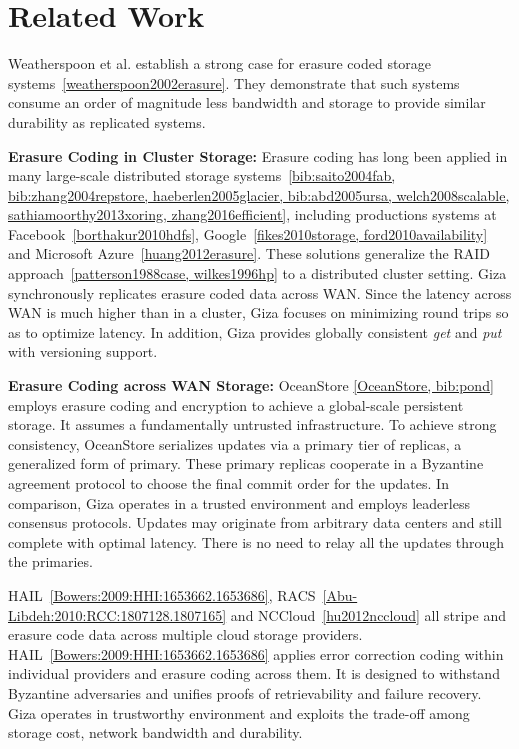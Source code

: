 \section{Related Work}


Weatherspoon et al. establish a strong case for erasure coded storage systems~\ref{weatherspoon2002erasure}. They demonstrate that such systems consume an order of magnitude less bandwidth and storage to provide similar durability as replicated systems.

{\bf Erasure Coding in Cluster Storage:}
Erasure coding has long been applied in many large-scale distributed storage systems~\ref{bib:saito2004fab, bib:zhang2004repstore, haeberlen2005glacier, bib:abd2005ursa, welch2008scalable, sathiamoorthy2013xoring, zhang2016efficient}, including productions systems at Facebook~\ref{borthakur2010hdfs}, Google~\ref{fikes2010storage, ford2010availability} and Microsoft Azure~\ref{huang2012erasure}. These solutions generalize the RAID approach~\ref{patterson1988case, wilkes1996hp} to a distributed cluster setting. Giza synchronously replicates erasure coded data across WAN. Since the latency across WAN is much higher than in a cluster, Giza focuses on minimizing round trips so as to optimize latency. In addition, Giza provides globally consistent {\em get} and {\em put} with versioning support.

{\bf Erasure Coding across WAN Storage:}
OceanStore \ref{OceanStore, bib:pond} employs erasure coding and encryption to achieve a global-scale persistent storage. It assumes a fundamentally untrusted infrastructure. To achieve strong consistency, OceanStore serializes updates via a primary tier of replicas, a generalized form of primary. These primary replicas cooperate in a Byzantine agreement protocol to choose the final commit order for the updates. In comparison, Giza operates in a trusted environment and employs leaderless consensus protocols. Updates may originate from arbitrary data centers and still complete with optimal latency. There is no need to relay all the updates through the primaries.

HAIL~\ref{Bowers:2009:HHI:1653662.1653686}, RACS~\ref{Abu-Libdeh:2010:RCC:1807128.1807165} and NCCloud~\ref{hu2012nccloud} all stripe and erasure code data across multiple cloud storage providers. 
HAIL~\ref{Bowers:2009:HHI:1653662.1653686} applies error correction coding within individual providers and erasure coding across them. It is designed to withstand Byzantine adversaries and unifies proofs of retrievability and failure recovery. Giza operates in trustworthy environment and exploits the trade-off among storage cost, network bandwidth and durability.

